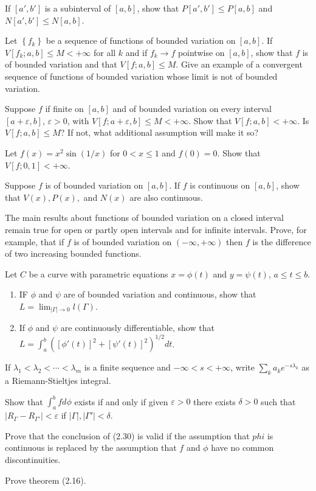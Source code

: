 \documentclass[12pt]{book}
\newcommand{\set}[1]{\left\{ #1 \right\}}
\newcommand{\ee}{\end{enumerate}}
\newcommand{\bee}{\begin{enumerate}[label = \bfseries (\alph*)]}
\newcommand{\listed}[3]{#1_1 #2 #1_2 #2 \cdots #2 #1_{#3}}
\renewcommand{\.}{\mkern1mu}
\newcommand{\e}{\varepsilon}
\newcommand{\abs}[1]{\left| #1 \right|}
\theoremstyle{theorem}
\begin{document}
\item If $[a',b']$ is a subinterval of $[a,b]$, show that $P[a',b']\leq P[a,b]$ and $N[a',b']\leq N[a,b]$.
\item Let $\set{f_k}$ be a sequence of functions of bounded variation on $[a,b]$. If $V[f_k;a,b] \leq M < +\infty$ for all $k$ and if $f_k \to f$ pointwise on $[a,b]$, show that $f$ is of bounded variation and that $V[f;a,b] \leq M$. Give an example of a convergent sequence of functions of bounded variation whose limit is not of bounded variation.
\item Suppose $f$ if finite on $[a,b]$ and of bounded variation on every interval $[a+\e, b]$, $\e>0$, with $V[f;a+\e,b] \leq M < +\infty$. Show that $V[f;a,b] < +\infty$. Is $V[f;a,b] \leq M$? If not, what additional assumption will make it so?
\item Let $f(x) = x^2\sin(1/x)$ for $0<x\leq 1$ and $f(0) = 0$. Show that $V[f;0,1] < +\infty$.
\item Suppose $f$ is of bounded variation on $[a,b]$. If $f$ is continuous on $[a,b]$, show that $V(x), P(x),$ and $N(x)$ are also continuous.
\item The main results about functions of bounded variation on a closed interval remain true for open or partly open intervals and for infinite intervals. Prove, for example, that if $f$ is of bounded variation on $(-\infty,+\infty)$ then $f$ is the difference of two increasing bounded functions.
\item Let $C$ be a curve with parametric equations $x = \phi(t)$ and $y = \psi(t)$, $a\leq t\leq b$. 
	\bee
	\item IF $\phi$ and $\psi$ are of bounded variation and continuous, show that $L=\lim_{\abs{\Gamma}\to 0}l(\Gamma)$.
	\item If $\phi$ and $\psi$ are continuously differentiable, show that $L = \int_a^b([\phi'(t)]^2 + [\psi'(t)]^2)^{1/2}dt$.
	\ee
\item If $\listed{\lambda}{<}{m}$ is a finite sequence and $-\infty < s < +\infty$, write $\sum_k a_k e^{-s\lambda_k}$ as a Riemann-Stieltjes integral. 
\item Show that $\int_a^b fd\phi$ exists if and only if given $\e > 0$ there exists $\delta > 0$ such that $\abs{R_\Gamma - R_{\Gamma'}} < \e$ if $\abs{\Gamma}, \abs{\Gamma'} < \delta$.
\item Prove that the conclusion of (2.30) is valid if the assumption that $phi$ is continuous is replaced by the assumption that $f$ and $\phi$ have no common discontinuities. 
\item Prove theorem (2.16).
\end{document}
